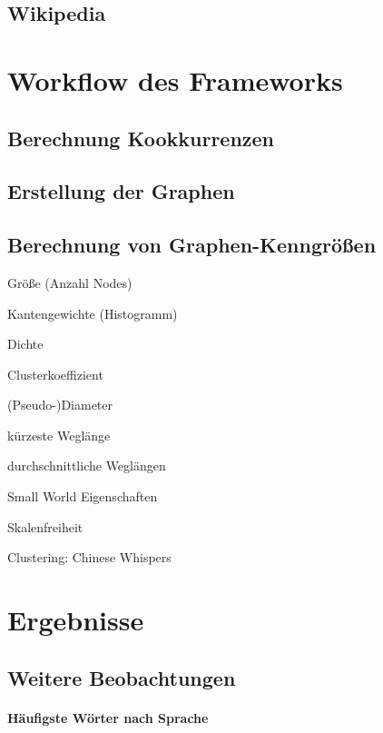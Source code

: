 \documentclass[12pt]{article}
\begin{document}
\subsection{Wikipedia}



\section{Workflow des Frameworks}

\subsection{Berechnung Kookkurrenzen}

\subsection{Erstellung der Graphen}

\subsection{Berechnung von Graphen-Kenngr\"o\ss{}en}

Gr\"o\ss{}e (Anzahl Nodes)

Kantengewichte (Histogramm)

Dichte

Clusterkoeffizient

(Pseudo-)Diameter

k\"urzeste Wegl\"ange

durchschnittliche Wegl\"angen

Small World Eigenschaften

Skalenfreiheit

Clustering: Chinese Whispers



\section{Ergebnisse}

\subsection{Weitere Beobachtungen}

\paragraph{H\"aufigste W\"orter nach Sprache}
\end{document}
